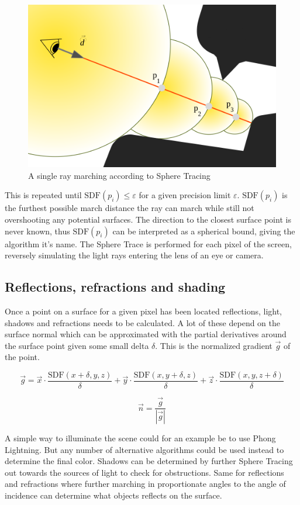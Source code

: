 		\vspace{40pt}
		\begin{figure}
			\begin{flushright}
				\includegraphics[width=0.9\linewidth]{figure/SDF2} 
			\end{flushright}
			\caption{A single ray marching according to Sphere Tracing}
			\vspace{40pt}
		\end{figure}

		This is repeated until $\text{SDF}(p_i) \leq \varepsilon$ for a given
		precision limit $\varepsilon$. $\text{SDF}(p_i)$ is the furthest possible
		march distance the ray can march while still not overshooting any potential
		surfaces. The direction to the closest surface point is never known, thus
		$\text{SDF}(p_i)$ can be interpreted as a spherical bound, giving the
		algorithm it's name. The Sphere Trace is performed for each pixel of the
		screen, reversely simulating the light rays entering the lens of an eye or
		camera.

			\subsection{Reflections, refractions and shading}

				Once a point on a surface for a given pixel has been located
				reflections, light, shadows and refractions needs to be calculated. A
				lot of these depend on the surface normal which can be approximated with
				the partial derivatives around the surface point given some small delta
				$\delta$. This is the normalized gradient $\vec{g}$ of the point.

				$$\vec{g} = \vec{x}\cdot\frac{\text{SDF}(x+\delta, y, z)}{\delta} +
				\vec{y}\cdot\frac{\text{SDF}(x, y+\delta, z)}{\delta} +
				\vec{z}\cdot\frac{\text{SDF}(x, y, z+\delta)}{\delta} $$

				$$\vec{n} = \frac{\vec{g}}{|\vec{g}|} $$

				A simple way to illuminate the scene could for an example be to use
				Phong Lightning\cite{Phong1975}. But any number of alternative
				algorithms could be used instead to determine the final color. Shadows
				can be determined by further Sphere Tracing out towards the sources of
				light to check for obstructions. Same for reflections and refractions
				where further marching in proportionate angles to the angle of
				incidence can determine what objects reflects on the surface.
